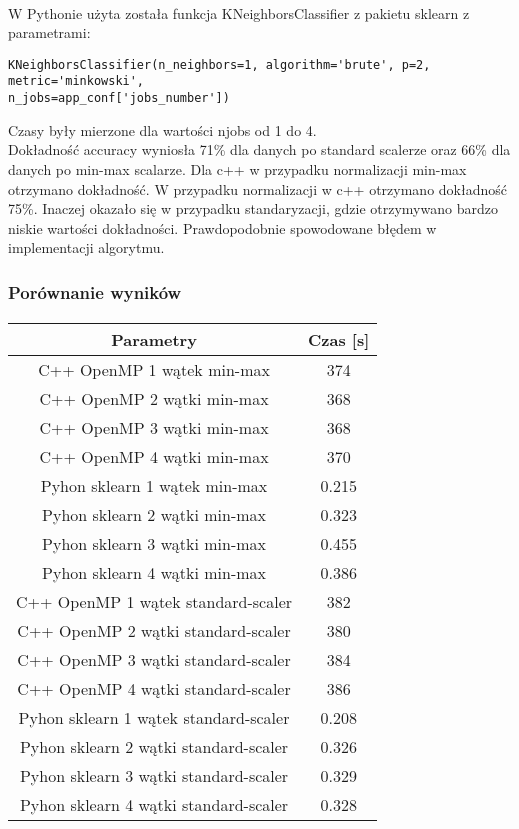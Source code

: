 \documentclass[a4paper,11pt]{article}
\begin{document}
\paragraph{}W Pythonie użyta została funkcja KNeighborsClassifier z pakietu sklearn z parametrami:
\begin{lstlisting}
KNeighborsClassifier(n_neighbors=1, algorithm='brute', p=2, metric='minkowski',
n_jobs=app_conf['jobs_number'])
\end{lstlisting}
Czasy były mierzone dla wartości njobs od 1 do 4. \\
Dokładność accuracy wyniosła 71\% dla danych po standard scalerze oraz 66\% dla danych po min-max scalarze. Dla c++ w przypadku normalizacji min-max otrzymano dokładność. 
W przypadku normalizacji w c++ otrzymano dokładność 75\%. Inaczej okazało się w przypadku standaryzacji, gdzie otrzymywano bardzo niskie wartości dokładności. Prawdopodobnie spowodowane błędem w implementacji algorytmu.
\subsubsection{Porównanie wyników} 
\paragraph{}
\begin{tabular}{|c|c|}
\hline Parametry&Czas [s] \\ 
\hline C++ OpenMP 1 wątek min-max& 374 \\
\hline C++ OpenMP 2 wątki min-max& 368 \\
\hline C++ OpenMP 3 wątki min-max& 368  \\
\hline C++ OpenMP 4 wątki min-max& 370 \\\hline
\hline Pyhon sklearn 1 wątek min-max& 0.215 \\
\hline Pyhon sklearn 2 wątki min-max& 0.323 \\
\hline Pyhon sklearn 3 wątki min-max& 0.455 \\
\hline Pyhon sklearn 4 wątki min-max& 0.386 \\\hline
\hline C++ OpenMP 1 wątek standard-scaler& 382 \\
\hline C++ OpenMP 2 wątki standard-scaler& 380 \\ 
\hline C++ OpenMP 3 wątki standard-scaler&   384 \\ 
\hline C++ OpenMP 4 wątki standard-scaler& 386 \\\hline
\hline Pyhon sklearn 1 wątek standard-scaler& 0.208 \\
\hline Pyhon sklearn 2 wątki standard-scaler& 0.326 \\
\hline Pyhon sklearn 3 wątki standard-scaler& 0.329 \\
\hline Pyhon sklearn 4 wątki standard-scaler& 0.328 \\\hline
\end{tabular}
\end{document}
